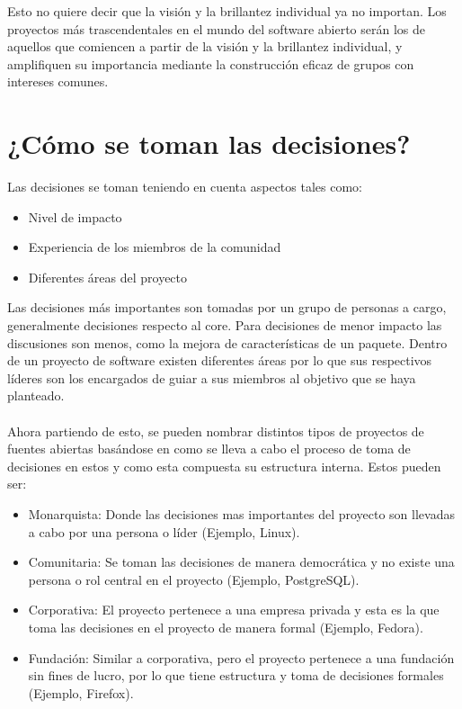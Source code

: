 Esto no quiere decir que la visión y la brillantez individual ya no importan. Los proyectos más trascendentales en el mundo del software abierto serán los de aquellos que comiencen a partir de la visión y la brillantez individual, y amplifiquen su importancia mediante la construcción eficaz de grupos con intereses comunes. 


\section{¿Cómo se toman las decisiones?}

Las decisiones se toman teniendo en cuenta aspectos tales como:
\begin{itemize}
     \item Nivel de impacto
     \item Experiencia de los miembros de la comunidad
     \item Diferentes áreas del proyecto
\end{itemize}

Las decisiones más importantes son tomadas por un grupo de personas a cargo, generalmente decisiones respecto al core. Para decisiones de menor impacto las discusiones son menos, como la mejora de características de un paquete.
Dentro de un proyecto de software existen diferentes áreas por lo que sus respectivos líderes son los encargados de guiar a sus miembros al objetivo que se haya planteado.
\\
\\
Ahora partiendo de esto, se pueden nombrar distintos tipos de proyectos de fuentes abiertas basándose en como se lleva a cabo el proceso de toma de decisiones en estos y como esta compuesta su estructura interna. Estos pueden ser:
\begin{itemize}
    \item Monarquista: Donde las decisiones mas importantes del proyecto son llevadas a cabo por una persona o líder (Ejemplo, Linux).
    \item Comunitaria: Se toman las decisiones de manera democrática y no existe una persona o rol central en el proyecto (Ejemplo, PostgreSQL).
    \item Corporativa: El proyecto pertenece a una empresa privada y esta es la que toma las decisiones en el proyecto de manera formal (Ejemplo, Fedora).
    \item Fundación: Similar a corporativa, pero el proyecto pertenece a una fundación sin fines de lucro, por lo que tiene estructura y toma de decisiones formales (Ejemplo, Firefox).
\end{itemize}

